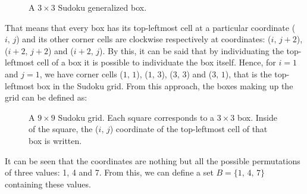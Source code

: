 \documentclass[]{usiinfprospectus}
\begin{document}
\begin{enumerate}[label={(\arabic*)}]
\begin{figure}[h]
\begin{center}
\end{center}
\caption{A $3\times 3$ Sudoku generalized box.}
\end{figure}

\noindent
That means that every box has its top-leftmost cell at a particular coordinate ($i,\,j$) and its other corner cells are clockwise respectively at coordinates: ($i,\,j+2$),  ($i+2,\,j+2$) and ($i+2,\,j$). By this, it can be said that by individuating the top-leftmost cell of a box it is possible to individuate the box itself. Hence, for $i=1$ and $j=1$, we have corner cells ($1,\,1$), ($1,\,3$),  ($3,\,3$) and ($3,\,1$), that is the top-leftmost box in the Sudoku grid. From this approach, the boxes making up the grid can be defined as:
\begin{figure}[h]
\begin{center}
\end{center}
\caption{A $9\times 9$ Sudoku grid. Each square corresponds to a $3\times 3$ box. Inside of the square, the ($i,\,j$) coordinate of the top-leftmost cell of that box is written.}
\end{figure}

\noindent
It can be seen that the coordinates are nothing but all the possible permutations of three values: 1, 4 and 7. From this, we can define a set $B=\{1,\,4,\,7\}$ containing these values.\\
\end{enumerate}
\newpage
\end{document}
